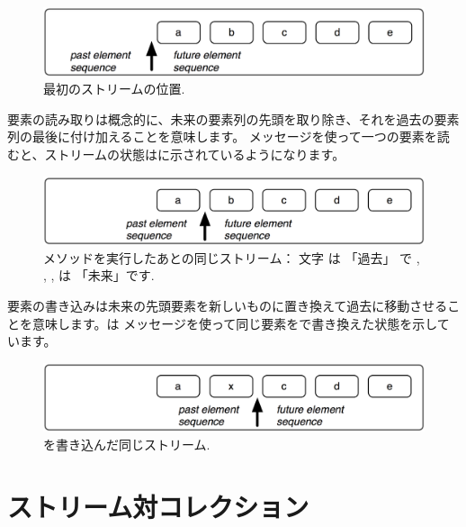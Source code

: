 \documentclass[a4paper,10pt,twoside]{book}
\begin{document}
\begin{figure}[ht]
\centerline{\includegraphics[scale=0.5]{_abcdeStef}}
\caption{最初のストリームの位置.}
\vspace{.2in}
\end{figure}

要素の読み取りは概念的に、未来の要素列の先頭を取り除き、それを過去の要素列の最後に付け加えることを意味します。
メッセージを使って一つの要素を読むと、ストリームの状態はに示されているようになります。

\begin{figure}[ht]
\centerline{\includegraphics[scale=0.5]{a_bcdeStef}}
\caption{メソッドを実行したあとの同じストリーム： 文字  は 「過去」 で , , ,  は 「未来」です.}
\vspace{.2in}
\end{figure}

要素の書き込みは未来の先頭要素を新しいものに置き換えて過去に移動させることを意味します。は メッセージを使って同じ要素をで書き換えた状態を示しています。


\begin{figure}[ht]
\centerline{\includegraphics[scale=0.5]{ax_cdeStef}}
\caption{を書き込んだ同じストリーム.}
\vspace{.2in}
\end{figure}

\section{ストリーム対コレクション}
\end{document}
